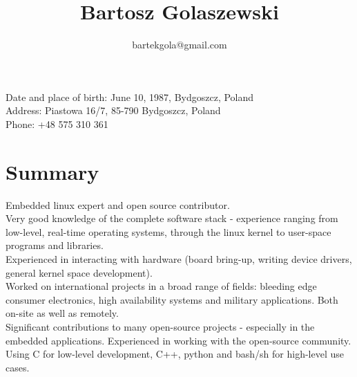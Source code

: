 \documentclass[10pt]{article}
\title{\bfseries\Huge Bartosz Golaszewski}
\author{bartekgola@gmail.com}
\date{}
\begin{document}
	\begin{minipage}{0.65\textwidth}
		\begingroup
		\let\center\flushleft
		\let\endcenter\endflushleft
		\maketitle
		\endgroup
	\end{minipage}
	\begin{minipage}{0.3\textwidth}
	\end{minipage}
	\vspace{2em}
	\linebreak
	\begin{minipage}[ht]{0.68\textwidth}
		Date and place of birth: June 10, 1987, Bydgoszcz, Poland\\
		Address: Piastowa 16/7, 85-790 Bydgoszcz, Poland\\
		Phone: +48 575 310 361
	\end{minipage}

	\vspace{20pt}

\section*{Summary}
Embedded linux expert and open source contributor.\\

Very good knowledge of the complete software stack - experience ranging from low-level, real-time
operating systems, through the linux kernel to user-space programs and libraries.\\

Experienced in interacting with hardware (board bring-up, writing device drivers, general kernel
space development).\\

Worked on international projects in a broad range of fields: bleeding edge consumer electronics,
high availability systems and military applications. Both on-site as well as remotely.\\

Significant contributions to many open-source projects - especially in the embedded applications.
Experienced in working with the open-source community.\\

Using C for low-level development, C++, python and bash/sh for high-level use cases.\\
\end{document}
